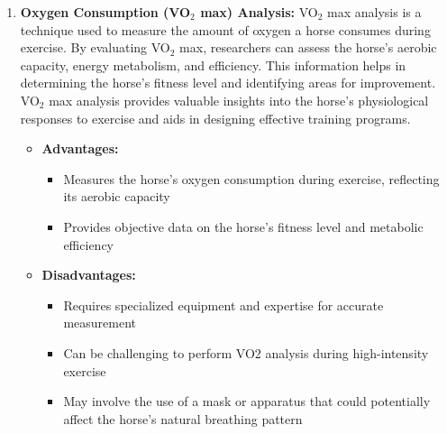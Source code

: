 \begin{enumerate}
\item \textbf{Oxygen Consumption (VO$_2$ max) Analysis:} VO$_2$ max analysis is a technique used to measure the amount of oxygen a horse consumes during exercise. By evaluating VO$_2$ max, researchers can assess the horse's aerobic capacity, energy metabolism, and efficiency. This information helps in determining the horse's fitness level and identifying areas for improvement. VO$_2$ max analysis provides valuable insights into the horse's physiological responses to exercise and aids in designing effective training programs.
\vspace{1cm}
\begin{itemize}
\item[] \textbf{\small Advantages:}
\begin{itemize}
\item Measures the horse's oxygen consumption during exercise, reflecting its aerobic capacity
\item Provides objective data on the horse's fitness level and metabolic efficiency
\end{itemize}
\item[] \textbf{\small Disadvantages:}
\begin{itemize}
\item Requires specialized equipment and expertise for accurate measurement
\item Can be challenging to perform VO2 analysis during high-intensity exercise
\item May involve the use of a mask or apparatus that could potentially affect the horse's natural breathing pattern
\end{itemize}
\end{itemize}


\end{enumerate}
